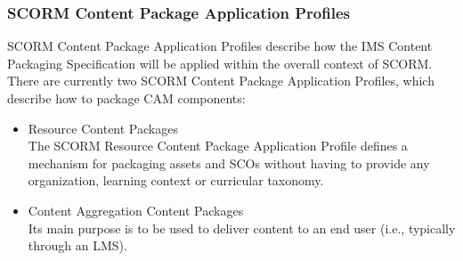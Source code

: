 \subsubsection{SCORM Content Package Application Profiles}
SCORM Content Package Application Profiles describe how the IMS Content Packaging Specification will be applied within the overall context of SCORM. 
There are currently two SCORM Content Package Application Profiles, which describe how to package CAM components: \cite{cambook}
\begin{itemize}
	\item Resource Content Packages \\
		The SCORM Resource Content Package Application Profile defines a mechanism for packaging assets and SCOs without having to provide any 
		organization, learning context or curricular taxonomy.
	\item Content Aggregation Content Packages \\
		Its main purpose is to be used to deliver content to an end user (i.e., typically through an LMS).
\end{itemize}
